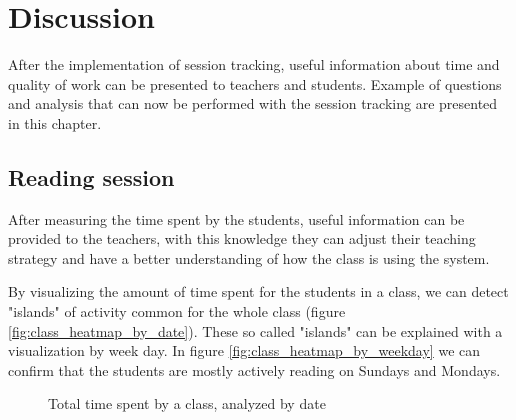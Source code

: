\chapter{Discussion}
After the implementation of session tracking, useful information about time and quality of work can be presented to teachers and students. Example of questions and analysis that can now be performed with the session tracking are presented in this chapter.

\section{Reading session}
After measuring the time spent by the students, useful information can be provided to the teachers, with this knowledge they can adjust their teaching strategy and have a better understanding of how the class is using the system.

By visualizing the amount of time spent for the students in a class, we can detect "islands" of activity common for the whole class (figure \ref{fig:class_heatmap_by_date}). These so called "islands" can be explained with a visualization by week day. In figure \ref{fig:class_heatmap_by_weekday} we can confirm that the students are mostly actively reading on Sundays and Mondays.

\begin{figure}[bth]
	\myfloatalign
	 \quad 
	 \quad
	\caption{Total time spent by a class, analyzed by date}
\end{figure}



